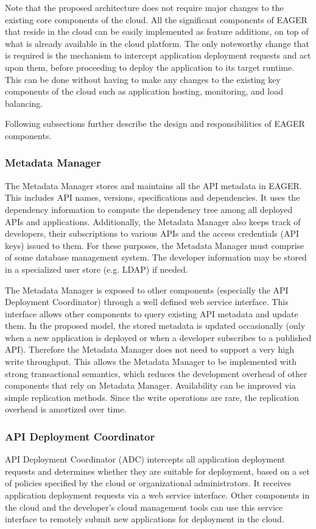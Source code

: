 Note that the proposed architecture does not require major changes to the existing core components of the cloud. All the 
significant components of EAGER that reside in the cloud can be easily implemented as feature additions, on top of what is already available 
in the cloud platform.
The only noteworthy change that is required is the mechanism to intercept application deployment requests and act upon them, before
proceeding to deploy the application to its target runtime. This can be done without having to make any changes to the existing key 
components of the cloud such as application hosting, monitoring, and load balancing.

Following subsections further describe the design and responsibilities of EAGER components.

\subsubsection{Metadata Manager}
The Metadata Manager stores and maintains all the API metadata in EAGER. This includes API names, versions, specifications and dependencies.
It uses the dependency information to compute the dependency tree among all deployed APIs and applications. Additionally, the Metadata Manager
also keeps track of developers, their subscriptions to various APIs and the access credentials (API keys) issued to them. For these purposes,
the Metadata Manager must comprise of some database management system. The developer information may be stored in a specialized user
store (e.g. LDAP) if needed.

The Metadata Manager is exposed to other components (especially the API Deployment Coordinator) through a well defined web service interface.
This interface allows other components to query existing API metadata and update them. In the proposed model, the stored metadata is updated 
occasionally (only when a new application is deployed or when a developer subscribes to a published API). Therefore the Metadata Manager
does not need to support a very high write throughput. This allows the Metadata Manager to be implemented with strong transactional semantics,
which reduces the development overhead of other components that rely on Metadata Manager. Availability can be improved via
simple replication methods. Since the write operations are rare, the replication overhead is amortized over time.

\subsubsection{API Deployment Coordinator}
API Deployment Coordinator (ADC) intercepts all application deployment requests and determines whether they are suitable for deployment, based
on a set of policies specified by the cloud or organizational administrators. It receives application deployment requests via a web service interface.
Other components in the cloud and the developer's cloud management tools can use this service interface to remotely submit new applications for
deployment in the cloud. 

